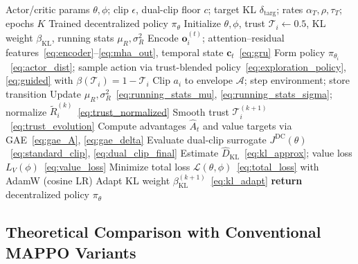 \documentclass[lettersize,journal]{IEEEtran}
\newcommand{\hladd}[1]{{\color{blue}#1}}
\begin{document}
\begin{algorithm}[!t]
\color{blue}
\caption{ART-MAPPO Training for Cooperative Swarm Interception (CTDE)}
\label{alg:artmappo}
\begin{algorithmic}[1]
\REQUIRE Actor/critic params $\theta,\phi$; clip $\epsilon$, dual-clip floor $c$; target KL $\delta_{\mathrm{targ}}$; rates $\alpha_T,\rho,\tau_T$; epochs $K$
\ENSURE Trained decentralized policy $\pi_{\theta}$
\STATE Initialize $\theta,\phi$, trust $\mathcal{T}_i\!\leftarrow\!0.5$, KL weight $\beta_{\mathrm{KL}}$, running stats $\mu_R,\sigma_R^2$
    \STATE Encode $\mathbf{o}_i^{(t)}$; attention--residual features~\eqref{eq:encoder}--\eqref{eq:mha_out}, temporal state $\mathbf{c}_t$~\eqref{eq:gru}
    \STATE Form policy $\pi_{\theta_i}$~\eqref{eq:actor_dist}; sample action via trust-blended policy~\eqref{eq:exploration_policy}, \eqref{eq:guided} with $\beta(\mathcal{T}_i)=1-\mathcal{T}_i$
    \STATE Clip $a_i$ to envelope $\mathcal{A}$; step environment; store transition
  \ENDFOR
  \STATE Update $\mu_R,\sigma_R^2$~\eqref{eq:running_stats_mu}, \eqref{eq:running_stats_sigma}; normalize $\tilde{R}_i^{(k)}$~\eqref{eq:trust_normalized}
  \STATE Smooth trust $\mathcal{T}_i^{(k+1)}$~\eqref{eq:trust_evolution}
  \STATE Compute advantages $\hat{A}_t$ and value targets via GAE~\eqref{eq:gae_A}, \eqref{eq:gae_delta}
    \STATE Evaluate dual-clip surrogate $J^{\mathrm{DC}}(\theta)$~\eqref{eq:standard_clip}, \eqref{eq:dual_clip_final}
    \STATE Estimate $\hat{D}_{\mathrm{KL}}$~\eqref{eq:kl_approx}; value loss $L_V(\phi)$~\eqref{eq:value_loss}
    \STATE Minimize total loss $\mathcal{L}(\theta,\phi)$~\eqref{eq:total_loss} with AdamW (cosine LR)
  \ENDFOR
  \STATE Adapt KL weight $\beta_{\mathrm{KL}}^{(k+1)}$~\eqref{eq:kl_adapt}
\ENDFOR
\STATE \textbf{return} decentralized policy $\pi_{\theta}$
\end{algorithmic}
\end{algorithm}

\subsection{\hladd{Theoretical Comparison with Conventional MAPPO Variants}}
\label{subsec:theory_comparison}
\end{document}
